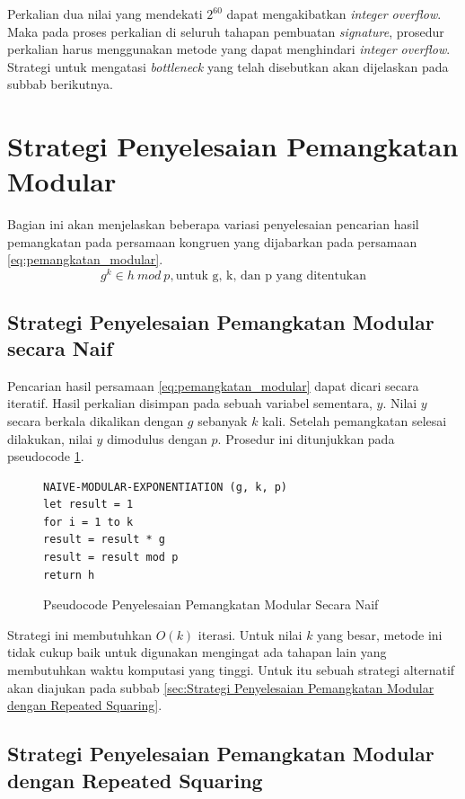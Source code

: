 Perkalian dua nilai yang mendekati $2^{60}$ dapat mengakibatkan \textit{integer overflow}. Maka pada proses perkalian di seluruh tahapan pembuatan \textit{signature}, prosedur perkalian harus menggunakan metode yang dapat menghindari \textit{integer overflow}. Strategi untuk mengatasi \textit{bottleneck} yang telah disebutkan akan dijelaskan pada subbab berikutnya.

\section{Strategi Penyelesaian Pemangkatan Modular}
Bagian ini akan menjelaskan beberapa variasi penyelesaian pencarian hasil pemangkatan pada persamaan kongruen yang dijabarkan pada persamaan \ref{eq:pemangkatan_modular}.
\begin{equation}
g^k\in h\ mod\ p,\text{untuk g, k, dan p yang ditentukan}
\label{eq:pemangkatan_modular}
\end{equation}

\subsection{Strategi Penyelesaian Pemangkatan Modular secara Naif}
Pencarian hasil persamaan \eqref{eq:pemangkatan_modular} dapat dicari secara iteratif. Hasil perkalian disimpan pada sebuah variabel sementara, $y$. Nilai $y$ secara berkala dikalikan dengan $g$ sebanyak $k$ kali. Setelah pemangkatan selesai dilakukan, nilai $y$ dimodulus dengan $p$. Prosedur ini ditunjukkan pada pseudocode \ref{psdo:modex_naive}.

\begin{figure}
\begin{lstlisting}[firstnumber=0]
NAIVE-MODULAR-EXPONENTIATION (g, k, p)
let result = 1
for i = 1 to k
result = result * g
result = result mod p
return h
\end{lstlisting}
\caption{Pseudocode Penyelesaian Pemangkatan Modular Secara Naif}
\label{psdo:modex_naive}
\end{figure}

Strategi ini membutuhkan $O(k)$ iterasi. Untuk nilai $k$ yang besar, metode ini tidak cukup baik untuk digunakan mengingat ada tahapan lain yang membutuhkan waktu komputasi yang tinggi. Untuk itu sebuah strategi alternatif akan diajukan pada subbab \ref{sec:Strategi Penyelesaian Pemangkatan Modular dengan Repeated Squaring}.

\subsection{Strategi Penyelesaian Pemangkatan Modular dengan Repeated Squaring}

